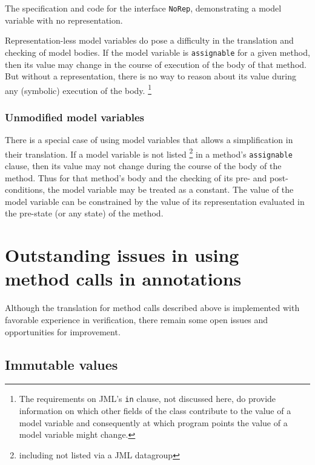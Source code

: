 \documentclass{sig-alternate}
\begin{document}
\begin{BFIGURE}

\caption{The specification and code for the interface \texttt{NoRep},
demonstrating a model variable with no representation.}
\label{fig:norep}
\end{BFIGURE}

Representation-less model variables do pose a difficulty in the translation and checking of model bodies.  If the model variable is \texttt{assignable} for a given method, then its value may 
change in the course of execution of the body of that method.  But without a representation,
there is no way to reason about its value during any (symbolic) execution of the body.
\footnote{The requirements on JML's  \texttt{in} clause, not discussed here, do provide information
on which other fields of the class contribute to the value of a model variable and consequently
at which program points the value of a model variable might change.}

\subsubsection{Unmodified model variables}

There is a special case of using model variables that allows a simplification in their translation.
If a model variable is not listed \footnote{including not listed via a JML datagroup} in a
method's \texttt{assignable} clause, then its value may not change during the course of the
body of the method.  Thus for that method's body and the checking of its pre- and
post-conditions, the model variable may be treated as a constant.  The value of the model 
variable can be constrained by the value of its representation evaluated in the pre-state
(or any state) of the method.

\section{Outstanding issues in using \\ method calls in annotations}

Although the translation for method calls described above is implemented with 
favorable experience in verification, there remain some open issues and opportunities 
for improvement.

\subsection{Immutable values}
\end{document}
